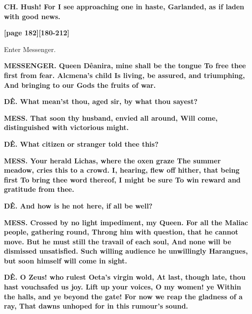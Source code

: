 \documentclass[11pt,letter]{book}
\begin{document}
\par \textbf{CH. Hush! For I see approaching one in haste, Garlanded, as if laden with good news.}
\par 

\par \textbf{[page 182][180-212]}
\par 

\par  Enter Messenger.

\par \textbf{MESSENGER. Queen Dêanira, mine shall be the tongue To free thee first from fear. Alcmena’s child Is living, be assured, and triumphing, And bringing to our Gods the fruits of war.}
\par 

\par \textbf{DÊ. What mean’st thou, aged sir, by what thou sayest?}
\par 

\par \textbf{MESS. That soon thy husband, envied all around, Will come, distinguished with victorious might.}
\par 

\par \textbf{DÊ. What citizen or stranger told thee this?}
\par 

\par \textbf{MESS. Your herald Lichas, where the oxen graze The summer meadow, cries this to a crowd. I, hearing, flew off hither, that being first To bring thee word thereof, I might be sure To win reward and gratitude from thee.}
\par 

\par \textbf{DÊ. And how is he not here, if all be well?}
\par 

\par \textbf{MESS. Crossed by no light impediment, my Queen. For all the Maliac people, gathering round, Throng him with question, that he cannot move. But he must still the travail of each soul, And none will be dismissed unsatisfied. Such willing audience he unwillingly Harangues, but soon himself will come in sight.}
\par 

\par \textbf{DÊ. O Zeus! who rulest Oeta’s virgin wold, At last, though late, thou hast vouchsafed us joy. Lift up your voices, O my women! ye Within the halls, and ye beyond the gate! For now we reap the gladness of a ray, That dawns unhoped for in this rumour’s sound.}
\par 
\end{document}

